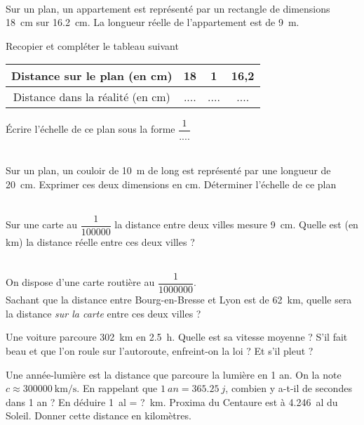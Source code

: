 \documentclass[../Cours.tex]{subfiles}
\begin{document}
\begin{questions}

\exercice\\ Sur un plan, un appartement est représenté par un rectangle de dimensions \qty{18}{cm} sur \qty{16,2}{cm}. La longueur réelle de l'appartement est de \qty{9}{m}.

\question Recopier et compléter le tableau suivant 
\begin{center}
\begin{tabular}{|c|c|c|c|}\hline
    Distance sur le plan (en \unit{cm}) & 18 & 1 & 16,2 \\\hline
    Distance dans la réalité (en \unit{cm}) & .... & .... & ....\\\hline
\end{tabular}
\end{center}

\question Écrire l'échelle de ce plan sous la forme $\dfrac{1}{....}$


\exercice\\ Sur un plan, un couloir de \qty{10}{m} de long est représenté par une longueur de \qty{20}{cm}.
\question Exprimer ces deux dimensions en \unit{cm}.
\question Déterminer l'échelle de ce plan

\exercice\\ Sur une carte au $\dfrac{1}{100000}$ la distance entre deux villes mesure \qty{9}{cm}.
\question Quelle est (en \unit{km}) la distance réelle entre ces deux villes ?

\exercice\\ On dispose d'une carte routière au $\dfrac{1}{1000000}$. \\Sachant que la distance entre Bourg-en-Bresse et Lyon est de \qty{62}{km}, quelle sera la distance \emph{sur la carte} entre ces deux villes ?

\end{questions}

\clearpage
\EXERCICES
\begin{questions}
    \exercice Une voiture parcoure \qty{302}{\kilo\metre} en \qty{2.5}{\hour}.
    \question Quelle est sa vitesse moyenne ?
    \question S'il fait beau et que l'on roule sur l'autoroute, enfreint-on la loi ?
    \question Et s'il pleut ?

    \exercice Une année-lumière est la distance que parcoure la lumière en 1 an. On la note $c \approx \qty{300000}{\kilo\metre\per\second}$.
    \question En rappelant que $\qty{1}{an} = \qty{365.25}{j}$, combien y a-t-il de secondes dans 1 an ?
    \question En déduire \qty{1}{al} = ?~\unit{\kilo\metre}.
    \question Proxima du Centaure est à \qty{4.246}{al} du Soleil. Donner cette distance en kilomètres.
\end{questions}
\end{document}
